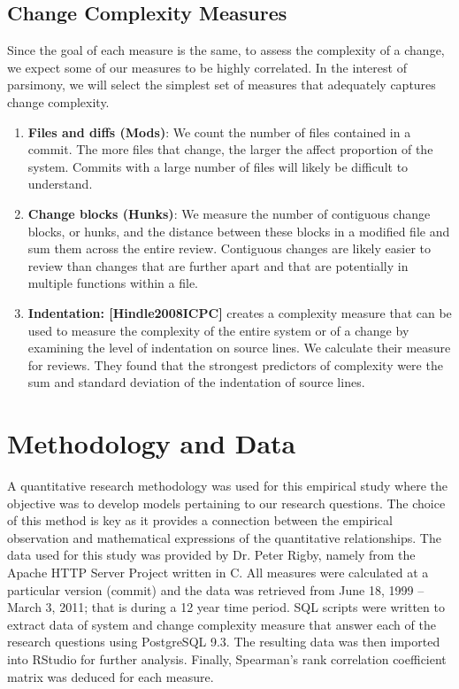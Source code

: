 \documentclass[9pt,twocolumn,a4paper]{article}
\begin{document}
\subsection{Change Complexity Measures}

Since the goal of each measure is the same, to assess the complexity of a change, we expect some of our measures to be highly correlated. In the interest of parsimony, we will select the simplest set of measures that adequately captures change complexity.

\begin{enumerate}

\item{\bf{Files and diffs (Mods)}}: We count the number of files contained in a commit. The more files that change, the larger the affect proportion of the system. Commits with a large number of files will likely be difficult to understand.

\item{\bf{Change blocks (Hunks)}}: We measure the number of contiguous change blocks, or hunks, and the distance between these blocks in a modified file and sum them across the entire review. Contiguous changes are likely easier to review than changes that are further apart and that are potentially in multiple functions within a file.

\item{\bf{Indentation: [Hindle2008ICPC]}} creates a complexity measure that can be used to measure the complexity of the entire system or of a change by examining the level of indentation on source lines. We calculate their measure for reviews. They found that the strongest predictors of complexity were the sum and standard deviation of the indentation of source lines.

\end{enumerate}



\section{Methodology and Data}

A quantitative research methodology was used for this empirical study where the objective was to develop models pertaining to our research questions. The choice of this method is key as it provides a connection between the empirical observation and mathematical expressions of the quantitative relationships. 
The data used for this study was provided by Dr. Peter Rigby, namely from the Apache HTTP Server Project written in C. All measures were calculated at a particular version (commit) and the data was retrieved from June 18, 1999 – March 3, 2011; that is during a 12 year time period. SQL scripts were written to extract data of system and change complexity measure that answer each of the research questions using PostgreSQL 9.3. The resulting data was then imported into RStudio for further analysis. Finally, Spearman’s rank correlation coefficient matrix was deduced for each measure. 
\end{document}
